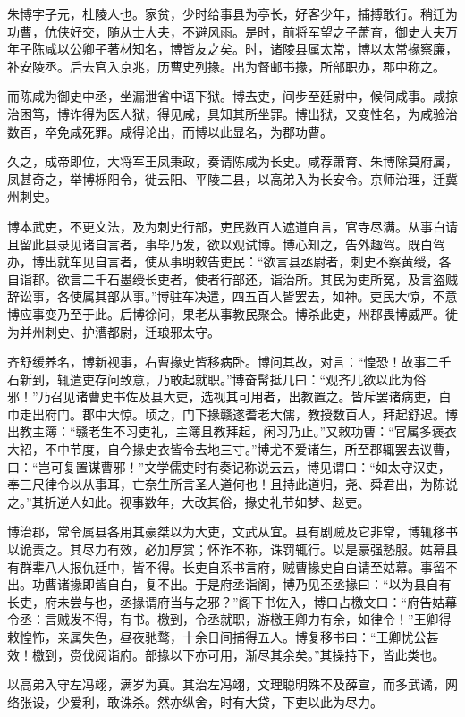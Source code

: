 \documentclass[]{article}
\begin{document}
朱博字子元，杜陵人也。家贫，少时给事县为亭长，好客少年，捕搏敢行。稍迁为功曹，伉侠好交，随从士大夫，不避风雨。是时，前将军望之子萧育，御史大夫万年子陈咸以公卿子著材知名，博皆友之矣。时，诸陵县属太常，博以太常掾察廉，补安陵丞。后去官入京兆，历曹史列掾。出为督邮书掾，所部职办，郡中称之。

而陈咸为御史中丞，坐漏泄省中语下狱。博去吏，间步至廷尉中，候伺咸事。咸掠治困笃，博诈得为医人狱，得见咸，具知其所坐罪。博出狱，又变性名，为咸验治数百，卒免咸死罪。咸得论出，而博以此显名，为郡功曹。

久之，成帝即位，大将军王凤秉政，奏请陈咸为长史。咸荐萧育、朱博除莫府属，凤甚奇之，举博栎阳令，徙云阳、平陵二县，以高弟入为长安令。京师治理，迁冀州刺史。

博本武吏，不更文法，及为刺史行部，吏民数百人遮道自言，官寺尽满。从事白请且留此县录见诸自言者，事毕乃发，欲以观试博。博心知之，告外趣驾。既白驾办，博出就车见自言者，使从事明敕告吏民：``欲言县丞尉者，刺史不察黄绶，各自诣郡。欲言二千石墨绶长吏者，使者行部还，诣治所。其民为吏所冤，及言盗贼辞讼事，各使属其部从事。''博驻车决遣，四五百人皆罢去，如神。吏民大惊，不意博应事变乃至于此。后博徐问，果老从事教民聚会。博杀此吏，州郡畏博威严。徙为并州刺史、护漕都尉，迁琅邪太守。

齐舒缓养名，博新视事，右曹掾史皆移病卧。博问其故，对言：``惶恐！故事二千石新到，辄遣吏存问致意，乃敢起就职。''博奋髯抵几曰：``观齐儿欲以此为俗邪！''乃召见诸曹史书佐及县大吏，选视其可用者，出教置之。皆斥罢诸病吏，白巾走出府门。郡中大惊。顷之，门下掾赣遂耆老大儒，教授数百人，拜起舒迟。博出教主簿：``赣老生不习吏礼，主簿且教拜起，闲习乃止。''又敕功曹：``官属多褒衣大袑，不中节度，自今掾史衣皆令去地三寸。''博尤不爱诸生，所至郡辄罢去议曹，曰：``岂可复置谋曹邪！''文学儒吏时有奏记称说云云，博见谓曰：``如太守汉吏，奉三尺律令以从事耳，亡奈生所言圣人道何也！且持此道归，尧、舜君出，为陈说之。''其折逆人如此。视事数年，大改其俗，掾史礼节如梦、赵吏。

博治郡，常令属县各用其豪桀以为大吏，文武从宜。县有剧贼及它非常，博辄移书以诡责之。其尽力有效，必加厚赏；怀诈不称，诛罚辄行。以是豪强慹服。姑幕县有群辈八人报仇廷中，皆不得。长吏自系书言府，贼曹掾史自白请至姑幕。事留不出。功曹诸掾即皆自白，复不出。于是府丞诣阁，博乃见丕丞掾曰：``以为县自有长吏，府未尝与也，丞掾谓府当与之邪？''阁下书佐入，博口占檄文曰：``府告姑幕令丞：言贼发不得，有书。檄到，令丞就职，游檄王卿力有余，如律令！''王卿得敕惶怖，亲属失色，昼夜驰鹜，十余日间捕得五人。博复移书曰：``王卿忧公甚效！檄到，赍伐阅诣府。部掾以下亦可用，渐尽其余矣。''其操持下，皆此类也。

以高弟入守左冯翊，满岁为真。其治左冯翊，文理聪明殊不及薛宣，而多武谲，网络张设，少爱利，敢诛杀。然亦纵舍，时有大贷，下吏以此为尽力。
\end{document}
